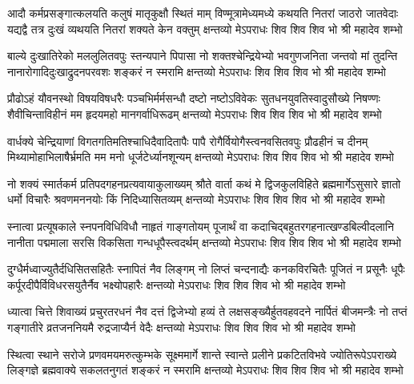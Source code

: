 \setlength{\shlokaspaceskip}{10pt}
\fourlineindentedshloka
{आदौ कर्मप्रसङ्गात्कलयति कलुषं मातृकुक्षौ स्थितं माम्}
{विण्मूत्रामेध्यमध्ये कथयति नितरां जाठरो जातवेदाः}
{यद्यद्वै तत्र दुःखं व्यथयति नितरां शक्यते केन वक्तुम्}
{क्षन्तव्यो मेऽपराधः शिव शिव शिव भो श्री महादेव शम्भो} %

\fourlineindentedshloka
{बाल्ये दुःखातिरेको मललुलितवपुः स्तन्यपाने पिपासा}
{नो शक्तश्चेन्द्रियेभ्यो भवगुणजनिता जन्तवो मां तुदन्ति}
{नानारोगादिदुःखाद्रुदनपरवशः शङ्करं न स्मरामि}
{क्षन्तव्यो मेऽपराधः शिव शिव शिव भो श्री महादेव शम्भो} %

\fourlineindentedshloka
{प्रौढोऽहं यौवनस्थो विषयविषधरैः पञ्चभिर्मर्मसन्धौ}
{दष्टो नष्टोऽविवेकः सुतधनयुवतिस्वादुसौख्ये निषण्णः}
{शैवीचिन्ताविहीनं मम हृदयमहो मानगर्वाधिरूढम्}
{क्षन्तव्यो मेऽपराधः शिव शिव शिव भो श्री महादेव शम्भो} %

\fourlineindentedshloka
{वार्धक्ये चेन्द्रियाणां विगतगतिमतिश्चाधिदैवादितापैः}
{पापै रोगैर्वियोगैस्त्वनवसितवपुः प्रौढहीनं च दीनम्}
{मिथ्यामोहाभिलाषैर्भ्रमति मम मनो धूर्जटेर्ध्यानशून्यम्}
{क्षन्तव्यो मेऽपराधः शिव शिव शिव भो श्री महादेव शम्भो} %

\fourlineindentedshloka
{नो शक्यं स्मार्तकर्म प्रतिपदगहनप्रत्यवायाकुलाख्यम्}
{श्रौते वार्ता कथं मे द्विजकुलविहिते ब्रह्ममार्गेऽसुसारे}
{ज्ञातो धर्मो विचारैः श्रवणमननयोः किं निदिध्यासितव्यम्}
{क्षन्तव्यो मेऽपराधः शिव शिव शिव भो श्री महादेव शम्भो} %

\fourlineindentedshloka
{स्नात्वा प्रत्यूषकाले स्नपनविधिविधौ नाहृतं गाङ्गतोयम्}
{पूजार्थं वा कदाचिद्बहुतरगहनात्खण्डबिल्वीदलानि}
{नानीता पद्ममाला सरसि विकसिता गन्धधूपैस्त्वदर्थम्}
{क्षन्तव्यो मेऽपराधः शिव शिव शिव भो श्री महादेव शम्भो} %

\fourlineindentedshloka
{दुग्धैर्मध्वाज्युतैर्दधिसितसहितैः स्नापितं नैव लिङ्गम्}
{नो लिप्तं चन्दनाद्यैः कनकविरचितैः पूजितं न प्रसूनैः}
{धूपैः कर्पूरदीपैर्विविधरसयुतैर्नैव भक्ष्योपहारैः}
{क्षन्तव्यो मेऽपराधः शिव शिव शिव भो श्री महादेव शम्भो} %

\fourlineindentedshloka
{ध्यात्वा चित्ते शिवाख्यं प्रचुरतरधनं नैव दत्तं द्विजेभ्यो}
{हव्यं ते लक्षसङ्ख्यैर्हुतवहवदने नार्पितं बीजमन्त्रैः}
{नो तप्तं गङ्गातीरे व्रतजननियमै रुद्रजाप्यैर्न वेदैः}
{क्षन्तव्यो मेऽपराधः शिव शिव शिव भो श्री महादेव शम्भो} %

\fourlineindentedshloka
{स्थित्वा स्थाने सरोजे प्रणवमयमरुत्कुम्भके सूक्ष्ममार्गे}
{शान्ते स्वान्ते प्रलीने प्रकटितविभवे ज्योतिरूपेऽपराख्ये}
{लिङ्गज्ञे ब्रह्मवाक्ये सकलतनुगतं शङ्करं न स्मरामि}
{क्षन्तव्यो मेऽपराधः शिव शिव शिव भो श्री महादेव शम्भो} %


